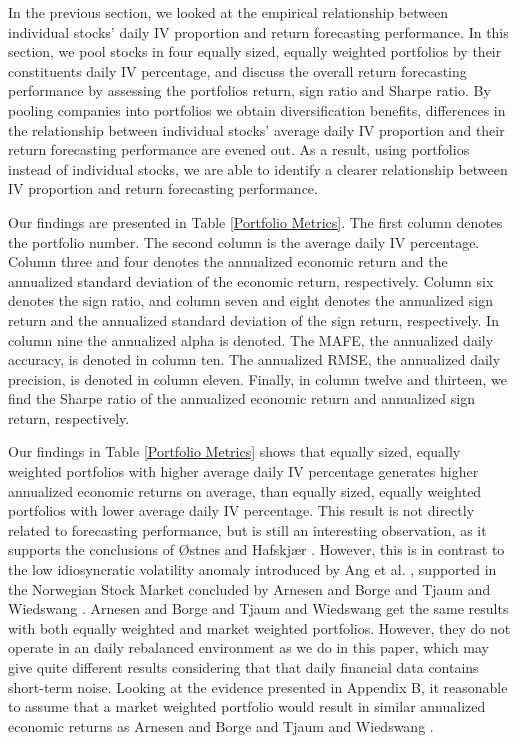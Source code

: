 In the previous section, we looked at the empirical relationship between individual stocks' daily IV proportion and return forecasting performance. In this section, we pool stocks in four equally sized, equally weighted portfolios by their constituents daily IV percentage, and discuss the overall return forecasting performance by assessing the portfolios return, sign ratio and Sharpe ratio. By pooling companies into portfolios we obtain diversification benefits, differences in the relationship between individual stocks' average daily IV proportion and their return forecasting performance are evened out. As a result, using portfolios instead of individual stocks, we are able to identify a clearer relationship between IV proportion and return forecasting performance. 

Our findings are presented in Table \ref{Portfolio Metrics}. The first column denotes the portfolio number. The second column is the average daily IV percentage. Column three and four denotes the annualized economic return and the annualized standard deviation of the economic return, respectively. Column six denotes the sign ratio, and column seven and eight denotes the annualized sign return and the annualized standard deviation of the sign return, respectively. In column nine the annualized alpha is denoted. The MAFE, the annualized daily accuracy, is denoted in column ten. The annualized RMSE, the annualized daily precision, is denoted in column eleven. Finally, in column twelve and thirteen, we find the Sharpe ratio of the annualized economic return and annualized sign return, respectively. 

Our findings in Table \ref{Portfolio Metrics} shows that equally sized, equally weighted portfolios with higher average daily IV percentage generates higher annualized economic returns on average, than equally sized, equally weighted portfolios with lower average daily IV percentage. This result is not directly related to forecasting performance, but is still an interesting observation, as it supports the conclusions of Østnes and Hafskjær \cite{ostnes}. However, this is in contrast to the low idiosyncratic volatility anomaly introduced by Ang et al. \cite{angetal06}, supported in the Norwegian Stock Market concluded by Arnesen and Borge \cite{arnborge} and Tjaum and Wiedswang \cite{thaumwiedswang}. Arnesen and Borge \cite{arnborge} and Tjaum and Wiedswang \cite{thaumwiedswang} get the same results with both equally weighted and market weighted portfolios. However, they do not operate in an daily rebalanced environment as we do in this paper, which may give quite different results considering that that daily financial data contains short-term noise. Looking at the evidence presented in Appendix B, it reasonable to assume that a market weighted portfolio would result in similar annualized economic returns as Arnesen and Borge \cite{arnborge} and Tjaum and Wiedswang \cite{thaumwiedswang}. 

